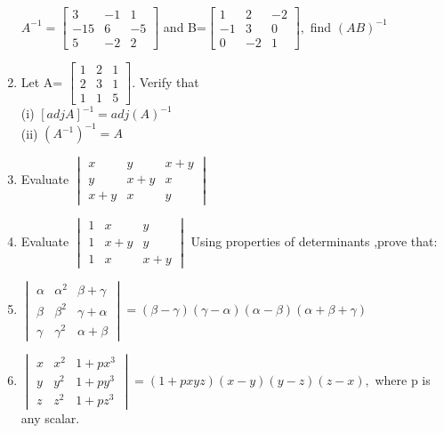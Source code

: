 \begin{enumerate}[label=\arabic*.,ref=\thesubsection.\theenumi]
$A^{-1}=\begin{bmatrix}
3&-1&1 \\ -15&6&-5 \\5&-2&2
\end{bmatrix}$ and B=$\begin{bmatrix}
1&2&-2 \\ -1&3&0 \\0&-2&1
\end{bmatrix},$ find $(AB)^{-1}$\\
\item Let A=
$\begin{bmatrix}
1&2&1 \\ 2&3&1 \\1&1&5
\end{bmatrix}.$ Verify that \\
(i) $[adj A]^{-1}=adj(A)^{-1}$\\
(ii) $(A^{-1})^{-1}=A$\\
\item Evaluate 
$\begin{vmatrix}
x&y&x+y \\ y&x+y&x \\ x+y&x&y
\end{vmatrix}$\\
\solution 

\item Evaluate 
$\begin{vmatrix}
1&x&y \\ 1&x+y&y \\ 1&x&x+y
\end{vmatrix}$
Using properties of determinants ,prove that:\\
\item $\begin{vmatrix}
\alpha&\alpha^2&\beta+\gamma \\ \beta&\beta^2&\gamma+\alpha \\ \gamma&\gamma^2&\alpha+\beta
\end{vmatrix}=(\beta-\gamma)(\gamma-\alpha)(\alpha-\beta)(\alpha+\beta+\gamma)$\\
\solution 

\item $\begin{vmatrix}
x&x^2&1+px^3 \\ y&y^2&1+py^3 \\z&z^2&1+pz^3
\end{vmatrix}=(1+pxyz)(x-y)(y-z)(z-x),$ where p is any scalar.\\
\solution 


\end{enumerate}
